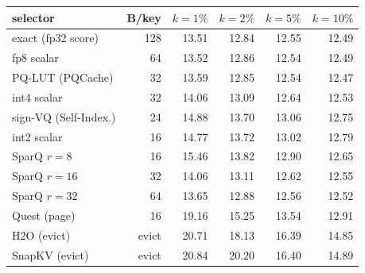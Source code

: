 \begin{tabular}{l r r r r r}
\toprule
selector & B/key & $k{=}1\%$ & $k{=}2\%$ & $k{=}5\%$ & $k{=}10\%$ \\
\midrule
exact (fp32 score) & 128 & 13.51 & 12.84 & 12.55 & 12.49 \\
fp8 scalar & 64 & 13.52 & 12.86 & 12.54 & 12.49 \\
PQ-LUT (PQCache) & 32 & 13.59 & 12.85 & 12.54 & 12.47 \\
int4 scalar & 32 & 14.06 & 13.09 & 12.64 & 12.53 \\
sign-VQ (Self-Index.) & 24 & 14.88 & 13.70 & 13.06 & 12.75 \\
int2 scalar & 16 & 14.77 & 13.72 & 13.02 & 12.79 \\
SparQ $r{=}8$ & 16 & 15.46 & 13.82 & 12.90 & 12.65 \\
SparQ $r{=}16$ & 32 & 14.06 & 13.11 & 12.62 & 12.55 \\
SparQ $r{=}32$ & 64 & 13.65 & 12.88 & 12.56 & 12.52 \\
Quest (page) & 16 & 19.16 & 15.25 & 13.54 & 12.91 \\
H2O (evict) & evict & 20.71 & 18.13 & 16.39 & 14.85 \\
SnapKV (evict) & evict & 20.84 & 20.20 & 16.40 & 14.89 \\
\bottomrule
\end{tabular}
